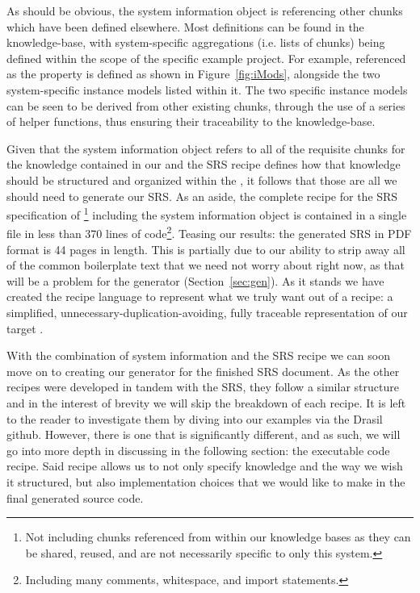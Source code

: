 As should be obvious, the system information object is referencing other chunks 
which have been defined elsewhere. Most definitions can be found in the 
knowledge-base, with system-specific aggregations (i.e. lists of chunks) being 
defined within the scope of the specific example project. For example, 
 referenced as the  property is defined 
as shown in Figure~\ref{fig:iMods}, alongside the two system-specific instance 
models listed within it. The two specific instance models can be seen to be 
derived from other existing chunks, through the use of a series of helper 
functions, thus ensuring their traceability to the knowledge-base.


Given that the system information object refers to all of the requisite chunks 
for the knowledge contained in our \sfs{} and the SRS recipe defines how that 
knowledge should be structured and organized within the \sf{}, it follows that 
those are all we should need to generate our SRS. As an aside, the complete 
recipe for the SRS specification of \gb{}\footnote{Not including chunks 
referenced from within our knowledge bases as they can be shared, reused, and 
are not necessarily specific to only this system.} including the system 
information object is contained in a single file in less than 370 lines of 
code\footnote{Including many comments, whitespace, and import statements.}. 
Teasing our results: the generated SRS in PDF format is 44 pages in length. 
This is partially due to our ability to strip away all of the common 
boilerplate text that we need not worry about right now, as that will be a 
problem for the generator (Section~\ref{sec:gen}). As it stands we have created 
the recipe language to represent what we truly want out of a recipe: a 
simplified, unnecessary-duplication-avoiding, fully traceable representation of 
our target \sf{}.

With the combination of system information and the SRS recipe we can soon move
on to creating our generator for the finished SRS document. As the other \sf{} 
recipes were developed in tandem with the SRS, they follow a similar structure 
and in the interest of brevity we will skip the breakdown of each recipe. It is 
left to the reader to investigate them by diving into our examples via the 
Drasil github. However, there is one \sf{} that is significantly different, and 
as such, we will go into more depth in discussing in the following section: the 
executable code recipe. Said recipe allows us to not only specify knowledge and 
the way we wish it structured, but also implementation choices that we would 
like to make in the final generated source code.

